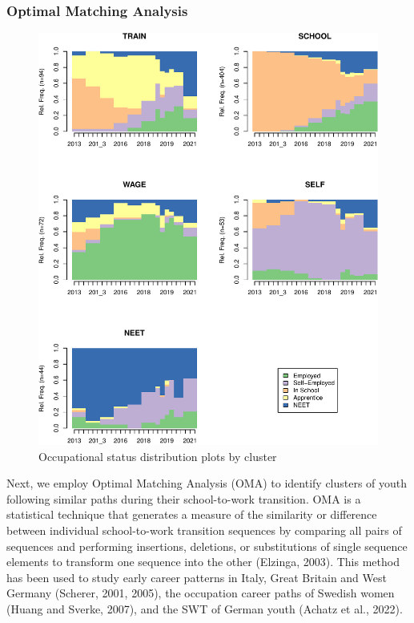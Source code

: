 \documentclass[
  11pt,
a4paper
]{article}
\begin{document}
\hypertarget{optimal-matching-analysis}{%
\subsubsection*{Optimal Matching Analysis}\label{optimal-matching-analysis}}

\begin{figure}
\includegraphics{figures/fig-clusters-1} \caption{Occupational status distribution plots by cluster}\label{fig:fig-clusters}
\end{figure}

Next, we employ Optimal Matching Analysis (OMA) to identify clusters of youth following similar paths during their school-to-work transition. OMA is a statistical technique that generates a measure of the similarity or difference between individual school-to-work transition sequences by comparing all pairs of sequences and performing insertions, deletions, or substitutions of single sequence elements to transform one sequence into the other (Elzinga, 2003). This method has been used to study early career patterns in Italy, Great Britain and West Germany (Scherer, 2001, 2005), the occupation career paths of Swedish women (Huang and Sverke, 2007), and the SWT of German youth (Achatz et al., 2022).
\end{document}
